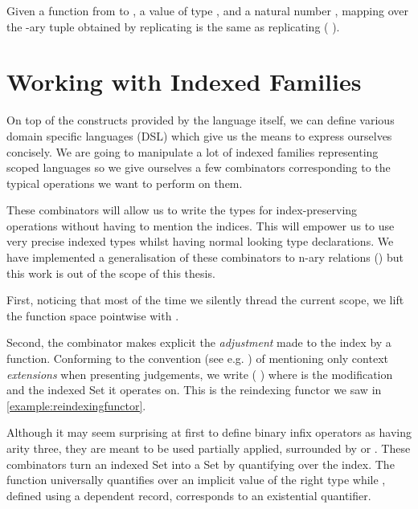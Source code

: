 \begin{lemma}
Given a function  from  to , a value  of type ,
and a natural number , mapping  over the -ary tuple obtained
by replicating  is the same as replicating ( ).
\end{lemma}




\section{Working with Indexed Families}
\label{sec:indexed-combinators}

On top of the constructs provided by the language itself, we can define various
domain specific languages (DSL) which give us the means to express ourselves
concisely. We are going to manipulate a lot of indexed families representing
scoped languages so we give ourselves a few combinators corresponding to the
typical operations we want to perform on them.

These combinators will allow us to write the types for index-preserving
operations without having to mention the indices. This will empower us
to use very precise indexed types whilst having normal looking type
declarations. We have implemented a generalisation of these combinators
to n-ary relations (\cite{DBLP:conf/icfp/Allais19}) but this work is out
of the scope of this thesis.



First, noticing that most of the time we silently thread the current scope, we lift
the function space pointwise with .


Second, the  combinator makes explicit the \emph{adjustment} made to the
index by a function. Conforming to the convention (see e.g. \cite{martin1982constructive})
of mentioning only context \emph{extensions} when presenting judgements, we write
({  }) where  is the modification and  the indexed
Set it operates on. This is the reindexing functor we saw in
\cref{example:reindexingfunctor}.


Although it may seem surprising at first to define binary infix operators as having
arity three, they are meant to be used partially applied, surrounded by 
or . These combinators turn an indexed Set into a Set by quantifying over
the index. The function  universally quantifies over an implicit value
of the right type while , defined using a dependent record, corresponds
to an existential quantifier.

